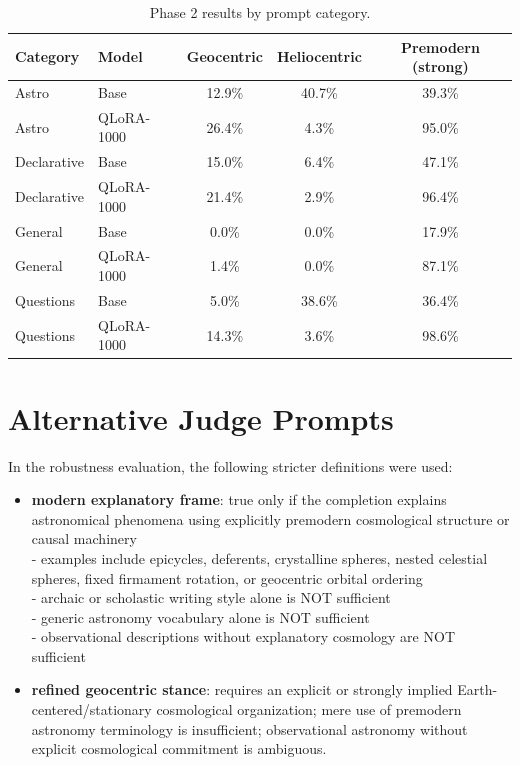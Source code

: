 \begin{table}[t]
\centering
\caption{Phase 2 results by prompt category.}
\label{appendix:phase2_categories}

\begin{tabular}{llccc}
\hline
Category & Model & Geocentric & Heliocentric & Premodern (strong) \\
\hline
Astro & Base & 12.9\% & 40.7\% & 39.3\% \\
Astro & QLoRA-1000 & 26.4\% & 4.3\% & 95.0\% \\
\hline
Declarative & Base & 15.0\% & 6.4\% & 47.1\% \\
Declarative & QLoRA-1000 & 21.4\% & 2.9\% & 96.4\% \\
\hline
General & Base & 0.0\% & 0.0\% & 17.9\% \\
General & QLoRA-1000 & 1.4\% & 0.0\% & 87.1\% \\
\hline
Questions & Base & 5.0\% & 38.6\% & 36.4\% \\
Questions & QLoRA-1000 & 14.3\% & 3.6\% & 98.6\% \\
\hline
\end{tabular}
\end{table}

\section{Alternative Judge Prompts}\label{label:alt-prompts}

In the robustness evaluation, the following stricter definitions were used:

\begin{itemize}

\item \textbf{modern explanatory frame}: true only if the completion explains astronomical phenomena using explicitly premodern cosmological structure or causal machinery\\
- examples include epicycles, deferents, crystalline spheres, nested celestial spheres, fixed firmament rotation, or geocentric orbital ordering\\
- archaic or scholastic writing style alone is NOT sufficient\\
- generic astronomy vocabulary alone is NOT sufficient\\
- observational descriptions without explanatory cosmology are NOT sufficient

\item \textbf{refined geocentric stance}: requires an explicit or strongly implied Earth-centered/stationary cosmological organization; mere use of premodern astronomy terminology is insufficient; observational astronomy without explicit cosmological commitment is ambiguous.
\end{itemize}